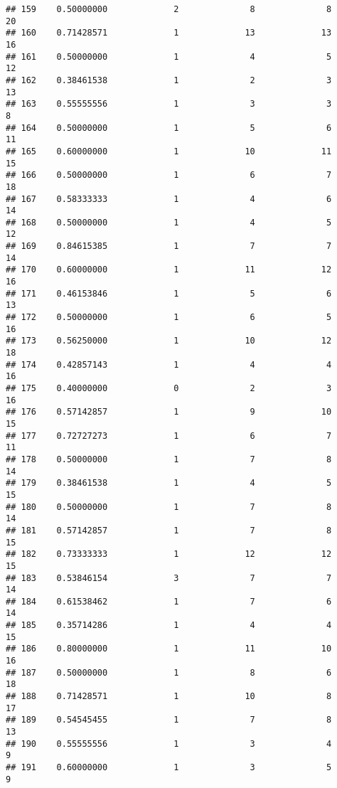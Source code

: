 \documentclass[
]{article}
\begin{document}
\begin{verbatim}
## 159    0.50000000             2              8              8             20
## 160    0.71428571             1             13             13             16
## 161    0.50000000             1              4              5             12
## 162    0.38461538             1              2              3             13
## 163    0.55555556             1              3              3              8
## 164    0.50000000             1              5              6             11
## 165    0.60000000             1             10             11             15
## 166    0.50000000             1              6              7             18
## 167    0.58333333             1              4              6             14
## 168    0.50000000             1              4              5             12
## 169    0.84615385             1              7              7             14
## 170    0.60000000             1             11             12             16
## 171    0.46153846             1              5              6             13
## 172    0.50000000             1              6              5             16
## 173    0.56250000             1             10             12             18
## 174    0.42857143             1              4              4             16
## 175    0.40000000             0              2              3             16
## 176    0.57142857             1              9             10             15
## 177    0.72727273             1              6              7             11
## 178    0.50000000             1              7              8             14
## 179    0.38461538             1              4              5             15
## 180    0.50000000             1              7              8             14
## 181    0.57142857             1              7              8             15
## 182    0.73333333             1             12             12             15
## 183    0.53846154             3              7              7             14
## 184    0.61538462             1              7              6             14
## 185    0.35714286             1              4              4             15
## 186    0.80000000             1             11             10             16
## 187    0.50000000             1              8              6             18
## 188    0.71428571             1             10              8             17
## 189    0.54545455             1              7              8             13
## 190    0.55555556             1              3              4              9
## 191    0.60000000             1              3              5              9

\end{verbatim}
\end{document}
